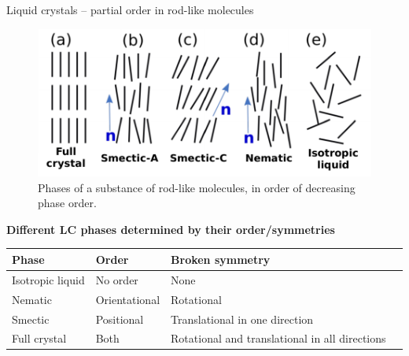 \documentclass[10pt,notes]{beamer}
\begin{document}
\begin{frame}[fragile]{Liquid crystals -- partial order in rod-like molecules}
    \newrefsection
    \begin{figure}
        \centering
        \includegraphics{figures/phases.pdf}
        \caption{
            Phases of a substance of rod-like molecules, in order of decreasing phase order\cite{pagetComplexTensorsSimple2023}.
        }
    \end{figure}
    \vspace{-0.5em}
    \normalsize\textbf{Different LC phases determined by their order/symmetries}\normalsize
    \vspace{-1.5em}
    \small
    \begin{table}
        \begin{tabular}{llll}
        Phase            & Order & Broken symmetry &  \\
        \hline
        Isotropic liquid & No order  & None &  \\
        Nematic          & Orientational & Rotational &  \\
        Smectic          & Positional & Translational in one direction & \\
        Full crystal     & Both & Rotational and translational in all directions &
        \end{tabular}
    \end{table}
    \vfill
    \printbibliography[heading=none]
    \vspace{-\fill}
\end{frame}
\end{document}
